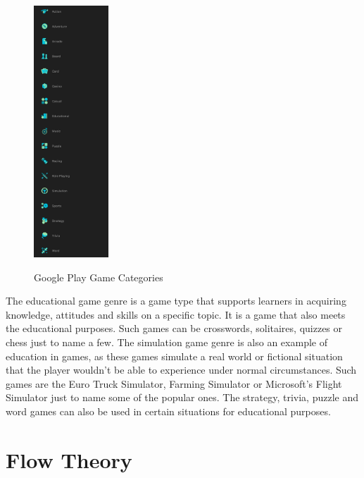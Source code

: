 \documentclass[10pt,oneside,english,a4paper]{article}
\begin{document}
\begin{figure}[h]
	\centering
	\caption{Google Play Game Categories}
    	\includegraphics[width=0.25\textwidth]{categories}
	\label{cat}
\end{figure}

\par
The educational game genre is a game type that supports learners in acquiring knowledge, attitudes and skills on a specific topic. It is a game that also meets the educational purposes. Such games can be crosswords, solitaires, quizzes or chess just to name a few.
The simulation game genre is also an example of education in games, as these games simulate a real world or fictional situation that the player wouldn't be able to experience under normal circumstances. Such games are the Euro Truck Simulator, Farming Simulator or Microsoft's Flight Simulator just to name some of the popular ones. 
The strategy, trivia, puzzle and word games can also be used in certain situations for educational purposes.

\section{Flow Theory} \label{flow theory}
\end{document}
